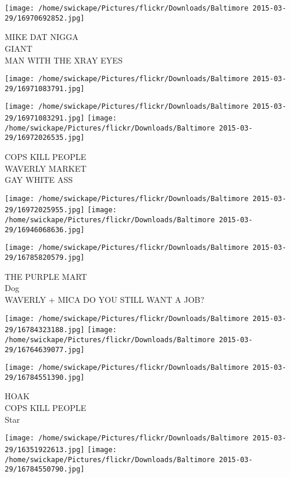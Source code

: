 \documentclass[10pt,letterpaper]{article}
\begin{document}
\vspace{0.25in}
\texttt{[image: /home/swickape/Pictures/flickr/Downloads/Baltimore 2015-03-29/16970692852.jpg]}

MIKE DAT NIGGA\\
GIANT\\
MAN WITH THE XRAY EYES\\
\pagebreak

\texttt{[image: /home/swickape/Pictures/flickr/Downloads/Baltimore 2015-03-29/16971083791.jpg]}

\vspace{0.25in}
\texttt{[image: /home/swickape/Pictures/flickr/Downloads/Baltimore 2015-03-29/16971083291.jpg]}
\texttt{[image: /home/swickape/Pictures/flickr/Downloads/Baltimore 2015-03-29/16972026535.jpg]}

COPS KILL PEOPLE\\
WAVERLY MARKET\\
GAY WHITE ASS\\
\pagebreak

\texttt{[image: /home/swickape/Pictures/flickr/Downloads/Baltimore 2015-03-29/16972025955.jpg]}
\texttt{[image: /home/swickape/Pictures/flickr/Downloads/Baltimore 2015-03-29/16946068636.jpg]}

\vspace{0.25in}
\texttt{[image: /home/swickape/Pictures/flickr/Downloads/Baltimore 2015-03-29/16785820579.jpg]}

THE PURPLE MART\\
Dog\\
WAVERLY + MICA DO YOU STILL WANT A JOB?\\
\pagebreak

\texttt{[image: /home/swickape/Pictures/flickr/Downloads/Baltimore 2015-03-29/16784323188.jpg]}
\texttt{[image: /home/swickape/Pictures/flickr/Downloads/Baltimore 2015-03-29/16764639077.jpg]}

\vspace{0.25in}
\texttt{[image: /home/swickape/Pictures/flickr/Downloads/Baltimore 2015-03-29/16784551390.jpg]}

HOAK\\
COPS KILL PEOPLE\\
Star\\
\pagebreak

\texttt{[image: /home/swickape/Pictures/flickr/Downloads/Baltimore 2015-03-29/16351922613.jpg]}
\texttt{[image: /home/swickape/Pictures/flickr/Downloads/Baltimore 2015-03-29/16784550790.jpg]}
\end{document}

